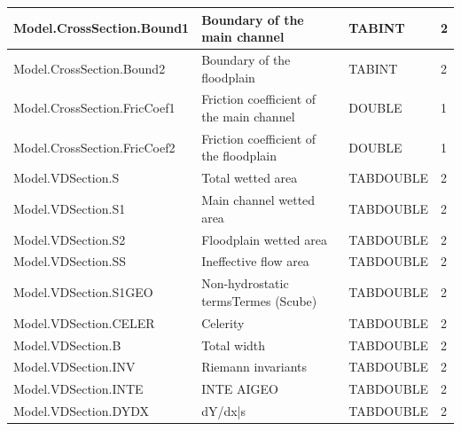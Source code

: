 \documentclass[a4paper,11pt]{article}
\begin{document}
\begin{landscape}
\begin{table}[ht]
\begin{center}
\begin{tabular}{|l|l|l|l|}
\hline  Model.CrossSection.Bound1 & Boundary of the main channel & TABINT & 2 \\
\hline  Model.CrossSection.Bound2 & Boundary of the floodplain & TABINT & 2 \\
\hline  Model.CrossSection.FricCoef1 & Friction coefficient of the main channel & DOUBLE & 1 \\
\hline  Model.CrossSection.FricCoef2 & Friction coefficient of the floodplain & DOUBLE & 1 \\
\hline  Model.VDSection.S & Total wetted area & TABDOUBLE & 2 \\
\hline  Model.VDSection.S1 & Main channel wetted area & TABDOUBLE & 2 \\
\hline  Model.VDSection.S2 & Floodplain wetted area & TABDOUBLE & 2 \\
\hline  Model.VDSection.SS & Ineffective flow area & TABDOUBLE & 2 \\
\hline  Model.VDSection.S1GEO & Non-hydrostatic termsTermes (Scube) & TABDOUBLE & 2 \\
\hline  Model.VDSection.CELER & Celerity & TABDOUBLE & 2 \\
\hline  Model.VDSection.B & Total width & TABDOUBLE & 2 \\
\hline  Model.VDSection.INV & Riemann invariants & TABDOUBLE & 2 \\
\hline  Model.VDSection.INTE & INTE AIGEO & TABDOUBLE & 2 \\
\hline  Model.VDSection.DYDX & dY/dx|s & TABDOUBLE & 2 \\
\hline

\end{tabular} 
\end{center}
\end{table}
\begin{table}[ht]
\begin{center}
\begin{tabular}{|l|l|l|l|}


\end{tabular}
\end{center}
\end{table}
\end{landscape}
\end{document}
